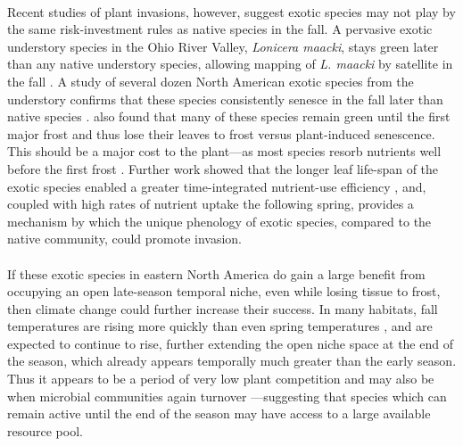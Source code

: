 \documentclass[11pt,a4paper,oneside]{article}
\begin{document}
\\
Recent studies of plant invasions, however, suggest exotic species may not play by the same risk-investment rules as native species in the fall. A pervasive exotic understory species in the Ohio River Valley, \emph{Lonicera maacki}, stays green later than any native understory species, allowing mapping of \emph{L. maacki} by satellite in the fall \citep{becker2013}. A study of several dozen North American exotic species from the understory confirms that these species consistently senesce in the fall later than native species \citep{Fridley:2012fj}. \citet{Fridley:2012fj} also found that many of these species remain green until the first major frost and thus lose their leaves to frost versus plant-induced senescence. This should be a major cost to the plant---as most species resorb nutrients well before the first frost \citep{Lambers:2008jb}. Further work showed that the longer leaf life-span of the exotic species enabled a greater time-integrated nutrient-use efficiency \citep{Heberling2013}, and, coupled with high rates of nutrient uptake the following spring, provides a mechanism by which the unique phenology of exotic species, compared to the native community, could promote invasion. \\
\\
If these exotic species in eastern North America do gain a large benefit from occupying an open late-season temporal niche, even while losing tissue to frost, then climate change could further increase their success. In many habitats, fall temperatures are rising more quickly than even spring temperatures \citep{cohen2012}, and are expected to continue to rise, further extending the open niche space at the end of the season, which already appears temporally much greater than the early season. Thus it appears to be a period of very low plant competition and may also be when microbial communities again turnover \citep{Bardgett:2005ls}---suggesting that species which can remain active until the end of the season may have access to a large available resource pool. \\
\\
\end{document}
